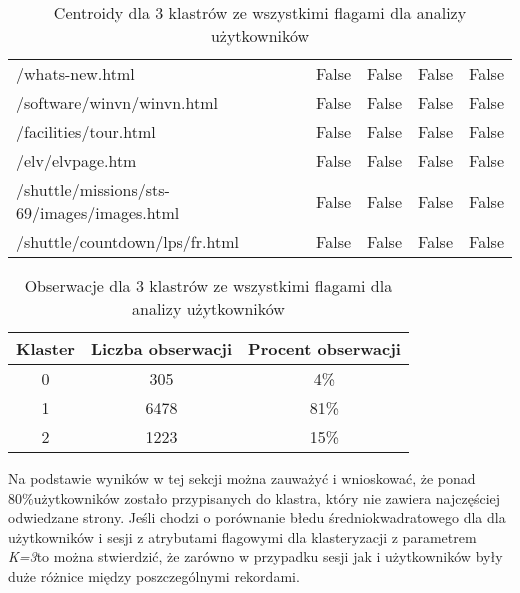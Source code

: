 \documentclass[../EDI_Task1_Karwowski_Kowalewski.tex]{subfiles}
\begin{document}
{{{\begin{table}[!htbp]
\begin{tabular}{|l|c|c|c|c|}
                    /whats-new.html                                   &     False   &   False   &   False   &   False \\
                    /software/winvn/winvn.html                        &     False   &   False   &   False   &   False \\
                    /facilities/tour.html                             &     False   &   False   &   False   &   False \\
                    /elv/elvpage.htm                                  &     False   &   False   &   False   &   False \\
                    /shuttle/missions/sts-69/images/images.html       &     False   &   False   &   False   &   False \\
                    /shuttle/countdown/lps/fr.html                    &     False   &   False   &   False   &   False \\ \hline
                \end{tabular}
                \caption
                {Centroidy dla 3 klastrów ze wszystkimi flagami dla analizy użytkowników}
                \label{user_k_3}
            \end{table}

            \begin{table}[!htbp]
                \footnotesize
                \centering
                \begin{tabular}{|c|c|c|}
                    \hline
                    Klaster & Liczba obserwacji & Procent obserwacji \\ \hline
                    0     &  305 &  4\% \\
                    1     & 6478 & 81\% \\
                    2     & 1223 & 15\% \\ \hline
                \end{tabular}
                \caption
                {Obserwacje dla 3 klastrów ze wszystkimi flagami dla analizy użytkowników}
                \label{stats_users_k_3}
            \end{table}
            \FloatBarrier

            Na podstawie wyników w tej sekcji można zauważyć i wnioskować, że
            ponad 80\%użytkowników zostało przypisanych do klastra, który nie zawiera
            najczęściej odwiedzane strony. Jeśli chodzi o porównanie błedu
            średniokwadratowego dla dla użytkowników i sesji z atrybutami flagowymi
            dla klasteryzacji z parametrem \textit{K=3}to można stwierdzić, że
            zarówno w przypadku sesji jak i użytkowników były duże różnice między
            poszczególnymi rekordami.
        }

}}
\end{document}
